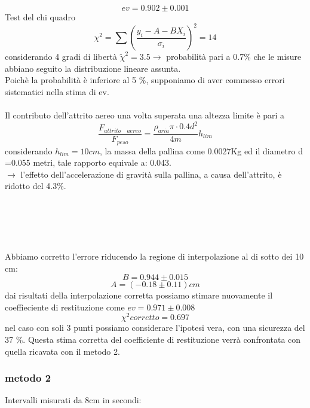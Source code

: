 \documentclass[a4paper]{article}
\theoremstyle{definition}
\begin{document}
\\\\
	 \[ev = 0.902 \pm 0.001\]
	 \noindent Test del chi quadro\\
	 \[\chi ^{2} = \sum \left ( \frac{y_{i}-A-BX_{i}}{\sigma_{i}} \right )^{2} = 14\]
	 \noindent considerando 4 gradi di libertà \(\tilde{\chi}^{2} = 3.5 \rightarrow  \)  probabilità pari a 0.7\(\%\) che le misure abbiano seguito la distribuzione lineare assunta.\\
	 Poichè la probabilità è inferiore al 5 \(\%\), supponiamo di aver commesso errori sistematici nella stima di ev.\\\\
	 Il contributo dell'attrito aereo una volta superata una altezza limite è pari a 
	 \[\frac{F_{attrito \quad aereo}}{F_{peso}} = \frac{\rho_{aria} \pi \cdot 0.4 d^{2}}{4m}h_{lim}\]
	 considerando \(h_{lim} = 10 cm\), la massa della pallina come 0.0027Kg ed il diametro d =0.055 metri, tale rapporto equivale a: 0.043.\\
	 \( \rightarrow \) l'effetto dell'accelerazione di gravità sulla pallina, a causa dell'attrito, è ridotto del 4.3\(\%\).\\\\\\\\\\\\
	 Abbiamo corretto l'errore riducendo la regione di interpolazione al di sotto dei 10 cm:
	 \[B = 0.944 \pm 0.015\]
	 \[A = (-0.18 \pm 0.11) cm\] 
	 dai risultati della interpolazione corretta possiamo stimare nuovamente il coeffieciente di restituzione come \(ev = 0.971 \pm 0.008 \)
	 \[\chi ^{2}corretto = 0.697\]
	 nel caso con soli 3 punti possiamo considerare l'ipotesi vera, con una sicurezza del 37 \(\%\). Questa stima corretta del coefficiente di restituzione verrà confrontata con quella ricavata con il metodo 2.
	\subsubsection*{metodo 2}

	
		\noindent Intervalli misurati da 8cm in secondi:
	
\end{document}
